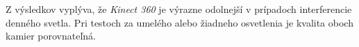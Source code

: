 Z výsledkov vyplýva, že \textit{Kinect 360} je výrazne odolnejší v prípadoch interferencie denného svetla. Pri testoch za umelého alebo žiadneho osvetlenia je kvalita oboch kamier porovnateľná. 
















